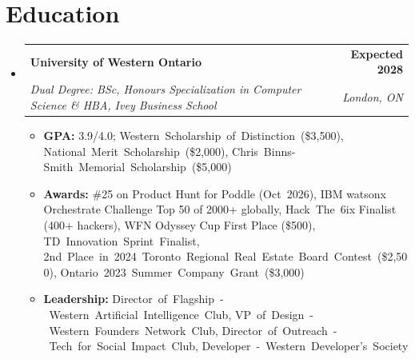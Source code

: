 \documentclass[letterpaper,10pt]{article}
\makeatletter
\newcommand{\resumeItem}[1]{
  \item\small{
    {#1 \vspace{-2pt}}
  }
}
\newcommand{\resumeSubheading}[4]{
  \vspace{-2pt}\item
    \begin{tabular*}{0.97\textwidth}[t]{l@{\extracolsep{\fill}}r}
      \textbf{#1} & \textbf{#2} \\
      \textit{\small#3} & \textit{\small #4} \\
    \end{tabular*}\vspace{-7pt}
}
\newcommand{\nb}[1]{\mbox{#1}} %
\newcommand{\resumeSubHeadingListStart}{\begin{itemize}[leftmargin=0.15in, label={}]}
\newcommand{\resumeSubHeadingListEnd}{\end{itemize}}
\newcommand{\resumeItemListStart}{\begin{itemize}}
\newcommand{\resumeItemListEnd}{\end{itemize}\vspace{-3pt}}
\makeatother
\begin{document}
\section{Education}
  \resumeSubHeadingListStart
    \resumeSubheading
      {University of Western Ontario}{Expected 2028}
      {Dual Degree: BSc, Honours Specialization in Computer Science \& HBA, Ivey Business School}{London, ON}
      \resumeItemListStart
        \resumeItem{\textbf{GPA:} 3.9/4.0; \nb{Western Scholarship of Distinction (\$3,500)}, \nb{National Merit Scholarship (\$2,000)}, \nb{Chris Binns-Smith Memorial Scholarship (\$5,000)}}
        \resumeItem{\textbf{Awards:} \#25 on Product Hunt for Poddle (Oct~2026), IBM watsonx Orchestrate Challenge Top 50 of 2000+ globally, \nb{Hack The 6ix} Finalist (400+ hackers), WFN Odyssey Cup First Place (\$500), \nb{TD Innovation Sprint Finalist}, \nb{2nd Place in 2024 Toronto Regional Real Estate Board Contest (\$2,500)}, \nb{Ontario 2023 Summer Company Grant (\$3,000)}}
        \resumeItem{\textbf{Leadership:} \nb{Director of Flagship - Western Artificial Intelligence Club}, \nb{VP of Design - Western Founders Network Club}, \nb{Director of Outreach - Tech for Social Impact Club}, \nb{Developer - Western Developer's Society}}
      \resumeItemListEnd
  \resumeSubHeadingListEnd
\end{document}
